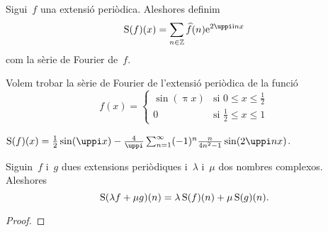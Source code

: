 \documentclass[../../main.tex]{subfiles}
\begin{document}
	\begin{definition}
		\label{def:sèrie de Fourier}
		Sigui~\(f\) una extensió periòdica.
		Aleshores definim
		\[
		    \sfourier(f)(x)=\sum_{n\in\mathbb{Z}}\widehat{f}(n)\e^{2\uppi\iu nx}
		\]
		com la sèrie de Fourier de~\(f\).
	\end{definition}
	\begin{example}
		\label{ex:trobar una sèrie de Fourier}
		Volem trobar la sèrie de Fourier de l'extensió periòdica de la funció
		\[f(x)=\begin{cases}
			\sin(\uppi x) & \text{si } 0\leq x\leq\frac{1}{2} \\
			0 & \text{si }\frac{1}{2}\leq x\leq 1
		\end{cases}\]
		\begin{solution}
			\(\sfourier(f)(x)=\frac{1}{2}\sin(\uppi x)-\frac{4}{\uppi}\sum_{n=1}^{\infty}(-1)^{n}\frac{n}{4n^{2}-1}\sin(2\uppi nx)\).
		\end{solution}
	\end{example}
	\begin{proposition}
		\label{prop:les sèries de Fourier són lineals}
		Siguin~\(f\) i~\(g\) dues extensions periòdiques i~\(\lambda\) i~\(\mu\) dos nombres complexos.
		Aleshores
		\[
		    \operatorname{S}(\lambda f+\mu g)(n)=\lambda\operatorname{S}(f)(n)+\mu\operatorname{S}(g)(n).
		\]
		\begin{proof}
		\end{proof}
	\end{proposition}
\end{document}
